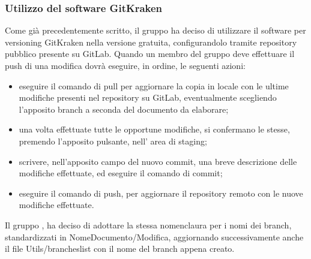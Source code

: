 \subsubsection{Utilizzo del software GitKraken}
Come già precedentemente scritto, il gruppo {\Gruppo} ha deciso di utilizzare il software per versioning GitKraken nella versione gratuita, configurandolo tramite repository pubblico presente su GitLab. Quando un membro del gruppo deve effettuare il push di una modifica dovrà eseguire, in ordine, le seguenti azioni:
\begin{itemize}
	\item eseguire il comando di pull per aggiornare la copia in locale con le ultime modifiche presenti nel repository su GitLab, eventualmente scegliendo l’apposito branch a seconda del documento da elaborare;
	\item una volta effettuate tutte le opportune modifiche, si confermano le stesse, premendo l’apposito pulsante, nell’ area di staging;
	\item scrivere, nell’apposito campo del nuovo commit, una breve descrizione delle modifiche effettuate, ed eseguire il comando di commit;
	\item eseguire il comando di push, per aggiornare il repository remoto con le nuove modifiche effettuate.
\end{itemize}
Il gruppo {\Gruppo}, ha deciso di adottare la stessa nomenclaura per i nomi dei branch, standardizzati in NomeDocumento/Modifica, aggiornando successivamente anche il file Utils/brancheslist con il nome del branch appena creato.

